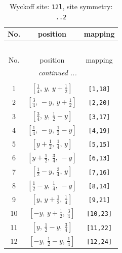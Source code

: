 \documentclass[fleqn,8pt]{jsarticle}
\begin{document}
\begin{longtable}{ccc}
\caption{Wyckoff site: {\tt 12l}, site symmetry: {\tt ..2}}
 \\
 \hline \hline
No. & position & mapping \\ \hline \endfirsthead

\multicolumn{2}{l}{\tablename\ \thetable{}} \\
 \hline \hline
No. & position & mapping \\ \hline \endhead

 \hline \hline
\multicolumn{2}{r}{\footnotesize\it continued ...} \\ \endfoot

 \hline \hline
\multicolumn{2}{r}{} \\ \endlastfoot

1 & $\left[ \frac{1}{4},\, y,\, y + \frac{1}{2} \right]$ & {\tt [1,18]} \\ \hline
2 & $\left[ \frac{3}{4},\, - y,\, y + \frac{1}{2} \right]$ & {\tt [2,20]} \\ \hline
3 & $\left[ \frac{3}{4},\, y,\, \frac{1}{2} - y \right]$ & {\tt [3,17]} \\ \hline
4 & $\left[ \frac{1}{4},\, - y,\, \frac{1}{2} - y \right]$ & {\tt [4,19]} \\ \hline
5 & $\left[ y + \frac{1}{2},\, \frac{1}{4},\, y \right]$ & {\tt [5,15]} \\ \hline
6 & $\left[ y + \frac{1}{2},\, \frac{3}{4},\, - y \right]$ & {\tt [6,13]} \\ \hline
7 & $\left[ \frac{1}{2} - y,\, \frac{3}{4},\, y \right]$ & {\tt [7,16]} \\ \hline
8 & $\left[ \frac{1}{2} - y,\, \frac{1}{4},\, - y \right]$ & {\tt [8,14]} \\ \hline
9 & $\left[ y,\, y + \frac{1}{2},\, \frac{1}{4} \right]$ & {\tt [9,21]} \\ \hline
10 & $\left[ - y,\, y + \frac{1}{2},\, \frac{3}{4} \right]$ & {\tt [10,23]} \\ \hline
11 & $\left[ y,\, \frac{1}{2} - y,\, \frac{3}{4} \right]$ & {\tt [11,22]} \\ \hline
12 & $\left[ - y,\, \frac{1}{2} - y,\, \frac{1}{4} \right]$ & {\tt [12,24]} \\
\end{longtable}
\renewcommand{\arraystretch}{1.2}
\end{document}
